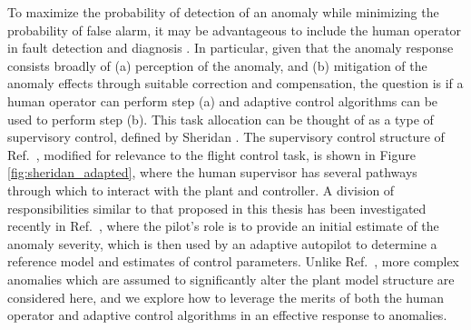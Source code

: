 
To maximize the probability of detection of an anomaly while minimizing the probability of false alarm, it may be advantageous to include the human operator in fault detection and diagnosis \cite{sheridan2000human}. In particular, given that the anomaly response consists broadly of (a) perception of the anomaly, and (b) mitigation of the anomaly effects through suitable correction and compensation, the question is if a human operator can perform step (a) and adaptive control algorithms can be used to perform step (b). This task allocation can be thought of as a type of supervisory control, defined by Sheridan \cite{sheridan1976toward, sheridan2011adaptive}. The supervisory control structure of Ref.~\cite{sheridan2011adaptive}, modified for relevance to the flight control task, is shown in Figure \ref{fig:sheridan_adapted}, where the human supervisor has several pathways through which to interact with the plant and controller. A division of responsibilities similar to that proposed in this thesis has been investigated recently in Ref.~\cite{farjadian2017bumpless}, where the pilot's role is to provide an initial estimate of the anomaly severity, which is then used by an adaptive autopilot to determine a reference model and estimates of control parameters. Unlike Ref.~\cite{farjadian2017bumpless}, more complex anomalies which are assumed to significantly alter the plant model structure are considered here, and we explore how to leverage the merits of both the human operator and adaptive control algorithms in an effective response to anomalies.

